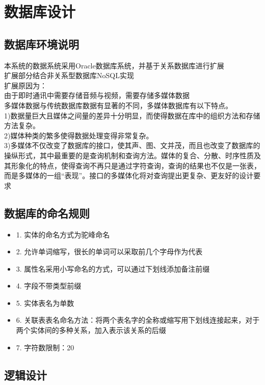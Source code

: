 \chapter{数据库设计}
\section{数据库环境说明}
本系统的数据系统采用Oracle数据库系统，并基于关系数据库进行扩展\\
扩展部分结合非关系型数据库NoSQL实现\\
扩展原因为：\\
由于即时通讯中需要存储音频与视频，需要存储多媒体数据\\
多媒体数据与传统数据库数据有显著的不同，多媒体数据库有以下特点。\\
1)数据量巨大且媒体之间量的差异十分明显，而使得数据在库中的组织方法和存储方法复杂。\\
2)媒体种类的繁多使得数据处理变得非常复杂。\\
3)多媒体不仅改变了数据库的接口，使其声、图、文并茂，而且也改变了数据库的操纵形式，其中最重要的是查询机制和查询方法。媒体的复合、分散、时序性质及其形象化的特点，使得查询不再只是通过字符查询，查询的结果也不仅是一张表，而是多媒体的一组“表现”。接口的多媒体化将对查询提出更复杂、更友好的设计要求



\section{数据库的命名规则}
\begin{itemize}
    \item 1. 实体的命名方式为驼峰命名
    \item 2. 允许单词缩写，很长的单词可以采取前几个字母作为代表
    \item 3. 属性名采用小写命名的方式，可以通过下划线添加备注前缀
    \item 4. 字段不带类型前缀
    \item 5. 实体表名为单数
    \item 6. 关联表表名命名方法：将两个表名字的全称或缩写用下划线连接起来，对于两个实体间的多种关系，加入表示该关系的后缀
    \item 7. 字符数限制：20
\end{itemize}

\section{逻辑设计}
